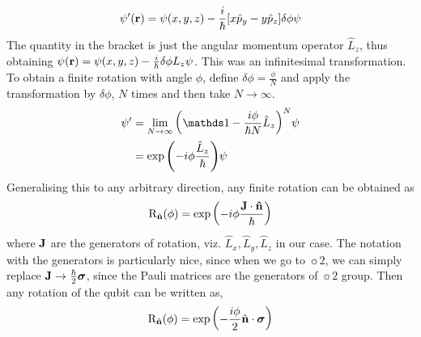 $$ \psi'(\vb{r}) = \psi(x,y,z) -\frac{i}{\hbar}\qty[x \hat{p}_y - y \hat{p}_z] \delta\phi \psi$$
The quantity in the bracket is just the angular momentum operator $\hat{L}_z$, thus obtaining $\psi(\vb{r})= \psi(x,y,z) - \frac{i}{\hbar} \delta\phi L_z\psi$. This was an infinitesimal transformation. To obtain a finite rotation with angle $\phi$, define $\delta \phi = \frac{\phi}{N}$ and apply the transformation by $\delta \phi$, $N$ times and then take $N\to \infty$.
\begin{align*}
    \psi' &= \lim\limits_{N\to \infty} \qty(\iden - \frac{i\phi}{\hbar N} \hat{L}_z )^N \psi \\
    &=\exp\qty(-i\phi \frac{\hat{L}_z}{\hbar})\psi
\end{align*}
Generalising this to any arbitrary direction, any finite rotation can be obtained as 
$$\mathrm{R}_{\hat{\vb{n}}}\qty(\phi)  = \exp\qty(-i\phi \frac{\vb{J}\cdot \vb{\hat{n}}}{\hbar})$$
where $\vb{J}$ are the generators of rotation, viz. $\hat{L}_x, \hat{L}_y, \hat{L}_z$ in our case. The notation with the generators is particularly nice, since when we go to $\sun{2}$, we can simply replace $\vb{J}\to \frac{\hbar}{2}\boldsymbol{\sigma}$, since the Pauli matrices are the generators of $\sun{2}$ group. Then any rotation of the qubit can be written as, 
$$\mathrm{R}_{\hat{\vb{n}}}\qty(\phi)  = \exp\qty(-\frac{i\phi}{2}\hat{\vb{n}}\cdot \boldsymbol{\sigma})$$